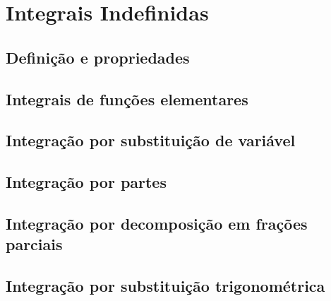 \chapter{Integrais Indefinidas}
\label{cap:integrais_indefinidas}

\section{Definição e propriedades}

\section{Integrais de funções elementares}

\section{Integração por substituição de variável}

\section{Integração por partes}

\section{Integração por decomposição em frações parciais}

\section{Integração por substituição trigonométrica}


